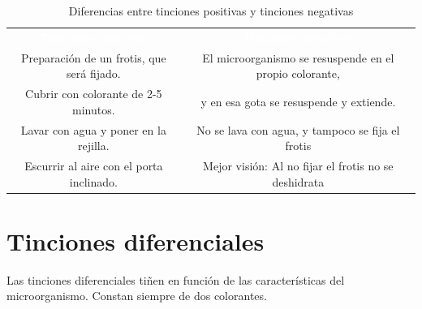 \begin{table}[H]
	\centering
	\begin{tabular}{c c}
		\rowcolor{black}\textcolor{white}{\textbf{Tinciones positivas}}&\textcolor{white}{\textbf{Tinciones negativas}}\\
		Preparación de un frotis, que será fijado.&El microorganismo se resuspende en el propio colorante,\\
		\rowcolor{hiperlightgray}Cubrir con colorante de 2-5 minutos.& y en esa gota se resuspende y extiende.\\
		Lavar con agua y poner en la rejilla.&No se lava con agua, y tampoco se fija el frotis\\
		\rowcolor{hiperlightgray}Escurrir al aire con el porta inclinado.&Mejor visión: Al no fijar el frotis no se deshidrata\\
		\hline
	\end{tabular}
	\caption{Diferencias entre tinciones positivas y tinciones negativas}
\end{table}
\section{Tinciones diferenciales}
Las tinciones diferenciales tiñen en función de las características del microorganismo. Constan siempre de dos colorantes.
